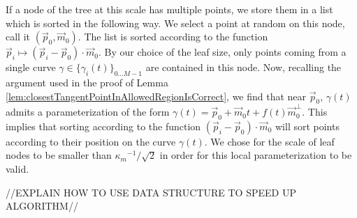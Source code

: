\documentclass{article}
\numberwithin{cntr}{section}
\numberwithin{equation}{section}
\newcommand{\vp}[0]{{\vec{p}}}
\newcommand{\vm}[0]{{\vec{m}}}
\newcommand{\Oto}[1]{{0 \ldots #1-1}}
\newcommand{\curveSet}{{ \{ \gamma_i(t) \}_{\Oto{M}}}}
\newcommand{\curvemax}{{\kappa_{m}}}
\newcommand{\curvemaxi}{{\curvemax^{-1}}}
\begin{document}
If a node of the tree at this scale has multiple points, we store them in a list which is sorted in the following way. We select a point at random on this node, call it $(\vp_{0},\vm_{0})$. The list is sorted according to the function $\vp_{i} \mapsto (\vp_{i} - \vp_{0}) \cdot \vm_{0}$. By our choice of the leaf size, only points coming from a single curve $\gamma \in \curveSet$ are contained in this node. Now, recalling the argument used in the proof of Lemma \ref{lem:closestTangentPointInAllowedRegionIsCorrect}, we find that near $\vp_{0}$, $\gamma(t)$ admits a parameterization of the form $\gamma(t)=\vp_{0} + \vm_{0} t + f(t) \vm_{0}^{\perp}$. This implies that sorting according to the function $(\vp_{i} - \vp_{0}) \cdot \vm_{0}$ will sort points according to their position on the curve $\gamma(t)$. We chose for the scale of leaf nodes to be smaller than $\curvemaxi / \sqrt{2}$ in order for this local parameterization to be valid.

//EXPLAIN HOW TO USE DATA STRUCTURE TO SPEED UP ALGORITHM//



\end{document}
